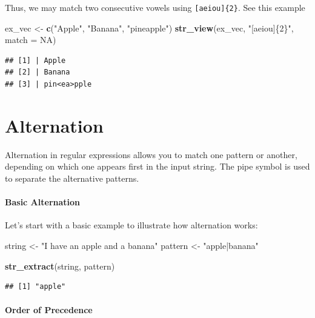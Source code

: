 \documentclass[
]{book}
\newenvironment{Shaded}{\begin{snugshade}}{\end{snugshade}}
\newcommand{\AttributeTok}[1]{\textcolor[rgb]{0.13,0.29,0.53}{#1}}
\newcommand{\ConstantTok}[1]{\textcolor[rgb]{0.56,0.35,0.01}{#1}}
\newcommand{\FunctionTok}[1]{\textcolor[rgb]{0.13,0.29,0.53}{\textbf{#1}}}
\newcommand{\NormalTok}[1]{#1}
\newcommand{\OtherTok}[1]{\textcolor[rgb]{0.56,0.35,0.01}{#1}}
\newcommand{\StringTok}[1]{\textcolor[rgb]{0.31,0.60,0.02}{#1}}
\begin{document}
Thus, we may match two consecutive vowels using \texttt{{[}aeiou{]}\{2\}}. See this example

\begin{Shaded}
\begin{Highlighting}[]
\NormalTok{ex\_vec }\OtherTok{\textless{}{-}} \FunctionTok{c}\NormalTok{(}\StringTok{"Apple"}\NormalTok{, }\StringTok{"Banana"}\NormalTok{, }\StringTok{"pineapple"}\NormalTok{)}
\FunctionTok{str\_view}\NormalTok{(ex\_vec, }\StringTok{"[aeiou]\{2\}"}\NormalTok{, }\AttributeTok{match =} \ConstantTok{NA}\NormalTok{)}
\end{Highlighting}
\end{Shaded}

\begin{verbatim}
## [1] | Apple
## [2] | Banana
## [3] | pin<ea>pple
\end{verbatim}

\hypertarget{alternation}{%
\section{Alternation}\label{alternation}}

Alternation in regular expressions allows you to match one pattern or another, depending on which one appears first in the input string. The pipe symbol \texttt{\textbar{}} is used to separate the alternative patterns.

\hypertarget{basic-alternation}{%
\paragraph{Basic Alternation}\label{basic-alternation}}

Let's start with a basic example to illustrate how alternation works:

\begin{Shaded}
\begin{Highlighting}[]
\NormalTok{string }\OtherTok{\textless{}{-}} \StringTok{"I have an apple and a banana"}
\NormalTok{pattern }\OtherTok{\textless{}{-}} \StringTok{"apple|banana"}

\FunctionTok{str\_extract}\NormalTok{(string, pattern)}
\end{Highlighting}
\end{Shaded}

\begin{verbatim}
## [1] "apple"
\end{verbatim}

\hypertarget{order-of-precedence}{%
\paragraph{Order of Precedence}\label{order-of-precedence}}
\end{document}
